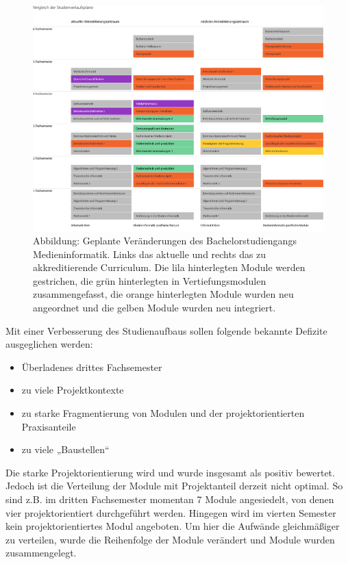 \begin{figure}[htbp]
\centering
\includegraphics[width=\columnwidth]{../anhaenge/bilder/ba-veraenderungen-studienverlaufsplan.pdf}
\caption{Abbildung: Geplante Veränderungen des Bachelorstudiengangs
Medieninformatik. Links das aktuelle und rechts das zu akkreditierende
Curriculum. Die lila hinterlegten Module werden gestrichen, die grün
hinterlegten in Vertiefungsmodulen zusammengefasst, die orange
hinterlegten Module wurden neu angeordnet und die gelben Module wurden
neu integriert.}
\end{figure}

Mit einer Verbesserung des Studienaufbaus sollen folgende bekannte
Defizite ausgeglichen werden:

\begin{itemize}
\tightlist
\item
  Überladenes drittes Fachsemester
\item
  zu viele Projektkontexte
\item
  zu starke Fragmentierung von Modulen und der projektorientierten
  Praxisanteile
\item
  zu viele „Baustellen``
\end{itemize}

Die starke Projektorientierung wird und wurde insgesamt als positiv
bewertet. Jedoch ist die Verteilung der Module mit Projektanteil derzeit
nicht optimal. So sind z.B. im dritten Fachsemester momentan 7 Module
angesiedelt, von denen vier projektorientiert durchgeführt werden.
Hingegen wird im vierten Semester kein projektorientiertes Modul
angeboten. Um hier die Aufwände gleichmäßiger zu verteilen, wurde die
Reihenfolge der Module verändert und Module wurden zusammengelegt.

